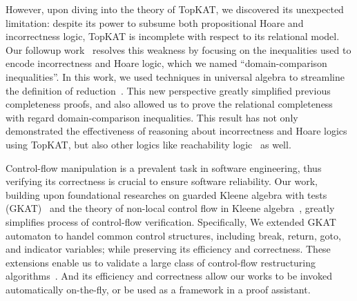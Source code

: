 \documentclass[11pt,a4paper,sans]{moderncv} %
\begin{document}
However, upon diving into the theory of TopKAT, we discovered its unexpected limitation: despite its power to subsume both propositional Hoare and incorrectness logic, TopKAT is incomplete with respect to its relational model. 
Our followup work~\cite{zhang_DomainReasoningTopKAT_2024} resolves this weakness by focusing on the inequalities used to encode incorrectness and Hoare logic, which we named ``domain-comparison inequalities''. 
In this work, we used techniques in universal algebra to streamline the definition of reduction~\cite{pous_ToolsCompletenessKleene_2021,kozen_KleeneAlgebraTests_1997c}.
This new perspective greatly simplified previous completeness proofs, and also allowed us to prove the relational completeness with regard domain-comparison inequalities. 
This result has not only demonstrated the effectiveness of reasoning about incorrectness and Hoare logics using TopKAT, but also other logics like reachability logic~\cite{naus_ReachabilityLogicLowLevel_2022a} as well.



Control-flow manipulation is a prevalent task in software engineering, thus verifying its correctness is crucial to ensure software reliability.
Our work, building upon foundational researches on guarded Kleene algebra with tests (GKAT)~\cite{smolka_GuardedKleeneAlgebra_2020} and the theory of non-local control flow in Kleene algebra~\cite{kozen_NonlocalFlowControl_2008a}, greatly simplifies process of control-flow verification.
Specifically, We extended GKAT automaton to handel common control structures, including break, return, goto, and indicator variables; while preserving its efficiency and correctness.
These extensions enable us to validate a large class of control-flow restructuring algorithms~\cite{yakdan_NoMoreGotos_2015,basque_AhoySAILRThere_,erosa_TamingControlFlow_1994,kozen_CertificationCompilerOptimizations_2000d}.
And its efficiency and correctness allow our works to be invoked automatically on-the-fly, or be used as a framework in a proof assistant.
\end{document}
